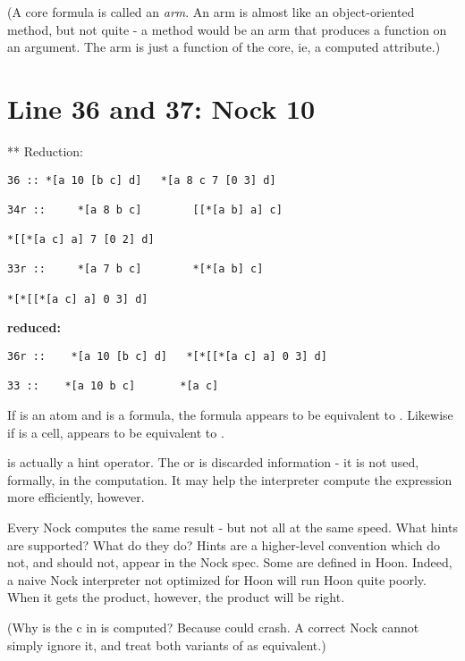(A core formula is called an \emph{arm}.  An arm is almost like an object-oriented
method, but not quite - a method would be an arm that produces a function on an
argument.  The arm is just a function of the core, ie, a computed attribute.)

\section{Line 36 and 37: Nock 10}

** Reduction:

\begin{framed_shaded}
\begin{Verbatim}[fontsize=\relsize{-2.5},fontseries=b,commandchars=\\\{\}]
 36 :: *[a 10 [b c] d]   *[a 8 c 7 [0 3] d]

34r ::     *[a 8 b c]        [[*[a b] a] c]

*[[*[a c] a] 7 [0 2] d]

33r ::     *[a 7 b c]        *[*[a b] c]

*[*[[*[a c] a] 0 3] d]
\end{Verbatim}
\end{framed_shaded}
\textbf{ reduced:}

\begin{framed_shaded}
\begin{Verbatim}[fontsize=\relsize{-2.5},fontseries=b,commandchars=\\\{\}]
36r ::    *[a 10 [b c] d]   *[*[[*[a c] a] 0 3] d]

33 ::    *[a 10 b c]       *[a c]
\end{Verbatim}
\end{framed_shaded}
If  is an atom and  is a formula, the formula \kode{[10 b c]} appears to be
equivalent to . Likewise if \kode{[b c]} is a cell, \kode{[10 [b c] d]} appears to be
equivalent to .

 is actually a hint operator.  The  or \kode{[b c]}is discarded information -
it is not used, formally, in the computation.  It may help the interpreter
compute the expression more efficiently, however.

Every Nock computes the same result - but not all at the same speed.  What
hints are supported?  What do they do?  Hints are a higher-level convention
which do not, and should not, appear in the Nock spec.  Some are defined in
Hoon.  Indeed, a naive Nock interpreter not optimized for Hoon will run Hoon
quite poorly.  When it gets the product, however, the product will be right.

(Why is the c in \kode{[b c]} is computed?  Because  could crash.  A correct
Nock cannot simply ignore it, and treat both variants of  as equivalent.)